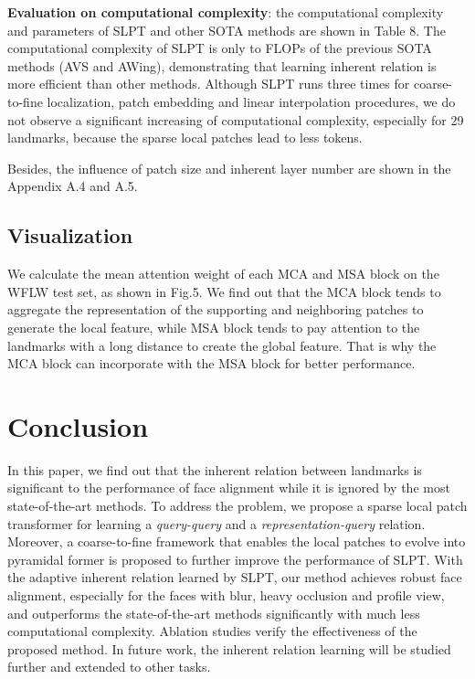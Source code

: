 \documentclass[10pt,twocolumn,letterpaper]{article}
\begin{document}
\textbf{Evaluation on computational complexity}: the computational complexity and parameters of SLPT and other SOTA methods are shown in Table 8. The computational complexity of SLPT is only  to  FLOPs of the previous SOTA methods (AVS and AWing), demonstrating that learning inherent relation is more efficient than other methods. Although SLPT runs three times for coarse-to-fine localization, patch embedding and linear interpolation procedures, we do not observe a significant increasing of computational complexity, especially for 29 landmarks, because the sparse local patches lead to less tokens. 

Besides, the influence of patch size and inherent layer number are shown in the Appendix A.4 and A.5.



\subsection{Visualization}
We calculate the mean attention weight of each MCA and MSA block on the WFLW test set, as shown in Fig.5. We find out that the MCA block tends to aggregate the representation of the supporting and neighboring patches to generate the local feature, while MSA block tends to pay attention to the landmarks with a long distance to create the global feature. That is why the MCA block can incorporate with the MSA block for better performance.

\section{Conclusion}
In this paper, we find out that the inherent relation between landmarks is significant to the performance of face alignment while it is ignored by the most state-of-the-art methods. To address the problem, we propose a sparse local patch transformer for learning a \textit{query-query} and a \textit{representation-query} relation. Moreover, a coarse-to-fine framework that enables the local patches to evolve into pyramidal former is proposed to further improve the performance of SLPT. With the adaptive inherent relation learned by SLPT, our method achieves robust face alignment, especially for the faces with blur, heavy occlusion and profile view, and outperforms the state-of-the-art methods significantly with much less computational complexity. Ablation studies verify the effectiveness of the proposed method. In future work, the inherent relation learning will be studied further and extended to other tasks. 
\end{document}
